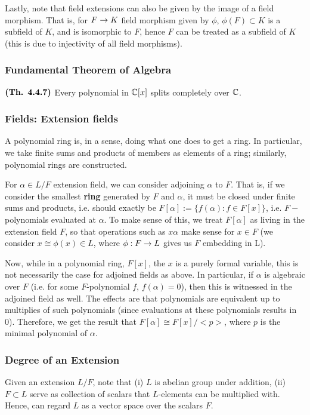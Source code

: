 \documentclass{article}
\begin{document}
Lastly, note that field extensions can also be given by the image of a field morphism. That is, for $F \rightarrow K$ field morphism given by $\phi$, $\phi(F) \subset K$ is a subfield of $K$, and is isomorphic to $F$, hence $F$ can be treated as a subfield of $K$ (this is due to injectivity of all field morphisms).

\subsubsection*{Fundamental Theorem of Algebra}

$\textbf{(Th. 4.4.7)}$ Every polynomial in $\mathbb{C}[x]$ splits completely over $\mathbb{C}$.

\subsubsection*{Fields: Extension fields}

A polynomial ring is, in a sense, doing what one does to get a ring. In particular, we take finite sums and products of members as elements of a ring; similarly, polynomial rings are constructed.

For $\alpha \in L/F$ extension field, we can consider adjoining $\alpha$ to $F$. That is, if we consider the smallest \textbf{ring} generated by $F$ and $\alpha$, it must be closed under finite sums and products, i.e. should exactly be $F[\alpha]:=\{f(\alpha): f \in F[x] \}$, i.e. $F-$polynomials evaluated at $\alpha$. To make sense of this, we treat $F[\alpha]$ as living in the extension field $F$, so that operations such as $x\alpha$ make sense for $x \in F$ (we consider $x \cong \phi(x) \in L$, where $\phi:F \rightarrow L$ gives us $F$ embedding in L).

Now, while in a polynomial ring, $F[x]$, the $x$ is a purely formal variable, this is not necessarily the case for adjoined fields as above. In particular, if $\alpha$ is algebraic over $F$ (i.e. for some $F$-polynomial $f$, $f(\alpha)=0$), then this is witnessed in the adjoined field as well. The effects are that polynomials are equivalent up to multiplies of such polynomials (since evaluations at these polynomials results in 0). Therefore, we get the result that $F[\alpha] \cong F[x]/<p>$, where $p$ is the minimal polynomial of $\alpha$.

\subsubsection*{Degree of an Extension}
Given an extension $L/F$, note that (i) $L$ is abelian group under addition, (ii) $F \subset L$ serve as collection of scalars that $L$-elements can be multiplied with. Hence, can regard $L$ as a vector space over the scalars $F$.
\end{document}
